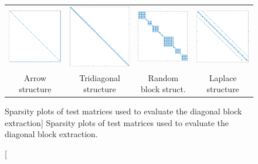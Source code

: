 \begin{figure}[t]
\begin{center}
{\scriptsize
\begin{tabular}{cccc}
\includegraphics[width=.2\columnwidth]{plots/arr.png}
&
\includegraphics[width=.2\columnwidth]{plots/tdg.png}
&
\includegraphics[width=.2\columnwidth]{plots/rnd.png}
&
\includegraphics[width=.2\columnwidth]{plots/lap.png} \\
Arrow structure & Tridiagonal structure & Random block struct. & Laplace structure
\end{tabular}
}
\end{center}
\caption
[Sparsity plots of test matrices used to evaluate the diagonal block extraction]
{Sparsity plots of test matrices used to evaluate the diagonal block extraction.}
\label{2017-gje-block-jacobi:fig:sparsityplots}
\end{figure}


